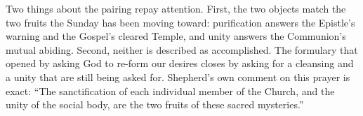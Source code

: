 Two things about the pairing repay attention. First, the two objects match
the two fruits the Sunday has been moving toward: purification answers the
Epistle's warning and the Gospel's cleared Temple, and unity answers the
Communion's mutual abiding. Second, neither is described as accomplished. The
formulary that opened by asking God to re-form our desires closes by asking
for a cleansing and a unity that are still being asked for. Shepherd's own
comment on this prayer is exact: ``The sanctification of each individual
member of the Church, and the unity of the social body, are the two fruits of
these sacred mysteries.''
